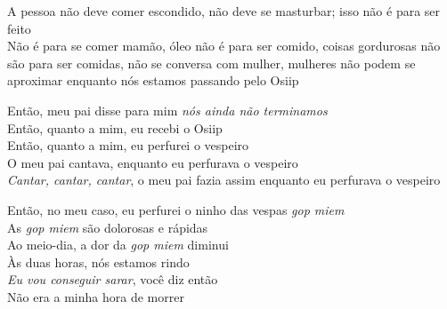 \bigskip

\begin{linenumbers}\begingroup\raggedright
\noindent A pessoa não deve comer escondido, não deve se masturbar; isso não é
 para ser feito\\
 Não é para se comer mamão, óleo não é para ser comido, coisas
 gordurosas não são para ser comidas, não se conversa com mulher,
 mulheres não podem se aproximar enquanto nós estamos passando pelo
 Osiip
 
\end{linenumbers}\endgroup

\bigskip

\begin{linenumbers}\begingroup\raggedright
 
\noindent Então, meu pai disse para mim \emph{nós ainda não terminamos}\\
 Então, quanto a mim, eu recebi o Osiip\\
 Então, quanto a mim, eu perfurei o vespeiro\\
 O meu pai cantava, enquanto eu perfurava o vespeiro\\
 \emph{Cantar, cantar, cantar}, o meu pai fazia assim enquanto eu perfurava o vespeiro
 
\end{linenumbers}\endgroup

\bigskip

\begin{linenumbers}\begingroup\raggedright
 
\noindent Então, no meu caso, eu perfurei o ninho das vespas \emph{gop miem}\\
 As \emph{gop miem} são dolorosas e rápidas\\
 Ao meio-dia, a dor da \emph{gop miem} diminui\\
 Às duas horas, nós estamos rindo\\
 \emph{Eu vou conseguir sarar}, você diz então\\
 Não era a minha hora de morrer
 
\end{linenumbers}\endgroup

